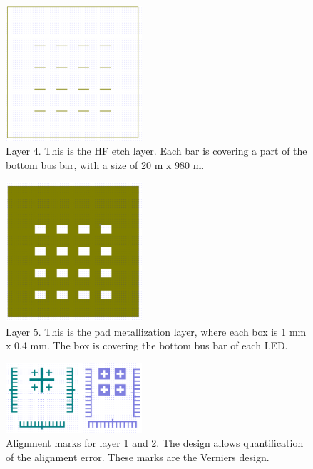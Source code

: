 \begin{figure}[ht]
    \centering
    \includegraphics[width=0.45\textwidth]{figures/CleWin_L4.png}
    \caption{
        Layer 4. 
        This is the HF etch layer. 
        Each bar is covering a part of the bottom bus bar, with a size of 20 \textmu m x 980 \textmu m.
    }
    \label{fig:CleWin_L4}
\end{figure}

\begin{figure}[ht]
    \centering
    \includegraphics[width=0.45\textwidth]{figures/CleWin_L5.png}
    \caption{
        Layer 5. 
        This is the pad metallization layer, where each box is 1 mm x 0.4 mm. 
        The box is covering the bottom bus bar of each LED. 
    }
    \label{fig:CleWin_L5}
\end{figure}


\begin{figure}[ht]
    \centering
    \includegraphics[width=0.45\textwidth]{figures/CleWin_alignment_marks.png}
    \caption{
        Alignment marks for layer 1 and 2. 
        The design allows quantification of the alignment error.
        These marks are the Verniers design. 
    }
    \label{fig:CleWin_alignment_marks}
\end{figure}